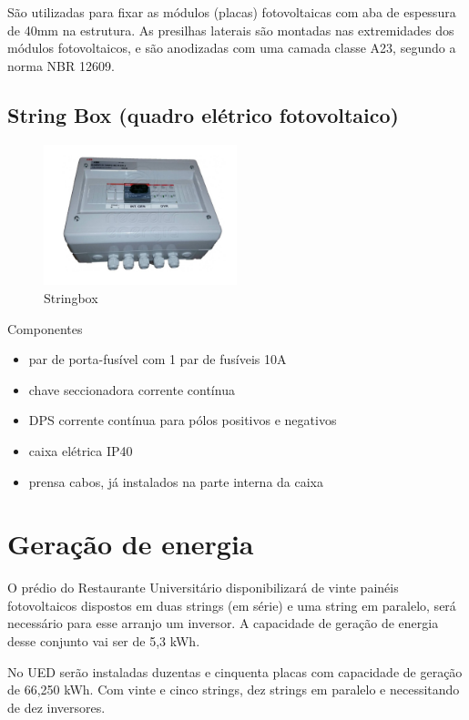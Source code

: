 São utilizadas para fixar as módulos (placas) fotovoltaicas com aba de espessura de 40mm na estrutura. As presilhas laterais são montadas nas extremidades dos módulos fotovoltaicos, e são anodizadas com uma camada classe A23, segundo a norma NBR 12609.

\subsection{String Box (quadro elétrico fotovoltaico)}

\begin{figure}[h]
\centering
\includegraphics[width=0.5\textwidth]{figuras/stringbox.PNG}
\caption{Stringbox}
\end{figure}
Componentes

\begin{itemize}
\item par de porta-fusível com 1 par de fusíveis 10A
\item chave seccionadora corrente contínua
\item DPS corrente contínua para pólos positivos  e negativos
\item caixa elétrica IP40
\item prensa cabos, já instalados na parte interna da caixa
\end{itemize}

\section{Geração de energia}
O prédio do Restaurante Universitário disponibilizará de vinte painéis fotovoltaicos dispostos em duas strings (em série) e uma string em paralelo, será necessário para esse arranjo um inversor. A capacidade de geração de energia desse conjunto vai ser de 5,3 kWh.

\par No UED serão instaladas duzentas e cinquenta placas com capacidade de geração de 66,250 kWh. Com vinte e cinco strings, dez strings em paralelo e necessitando de dez inversores.

